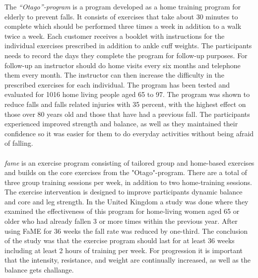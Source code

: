 The \emph{“Otago”-program} is a program developed as a home training program for elderly to prevent falls. It consists of exercises that take about 30 minutes to complete which should be performed three times a week in addition to a walk twice a week. Each customer receives a booklet with instructions for the individual exercises prescribed in addition to ankle cuff weights. The participants needs to record the days they complete the program for follow-up purposes. For follow-up an instructor should do home visits every six months and telephone them every month. The instructor can then increase the difficulty in the prescribed exercises for each individual. The program has been tested and evaluated for 1016 home living people aged 65 to 97. The program was shown to reduce falls and falls related injuries with 35 percent, with the highest effect on those over 80 years old and those that have had a previous fall. The participants experienced improved strength and balance, as well as they maintained their confidence so it was easier for them to do everyday activities without being afraid of falling. \cite{otago} \cite{gruppetrening-trheim}\\ \\
\emph{\ac{fame}} is an exercise program consisting of tailored group and home-based exercises and builds on the core exercises from the "Otago"-program.  There are a total of three group training sessions per week, in addition to two home-training sessions. The exercise intervention is designed to improve participants dynamic balance and core and leg strength.  In the United Kingdom a study was done where they examined the effectiveness of this program for home-living women aged 65 or older who had already fallen 3 or more times within the previous year. After using FaME for 36 weeks the fall rate was reduced by one-third. The conclusion of the study was that the exercise program should last for at least 36 weeks including at least 2 hours of training per week. For progression it is important that the intensity, resistance, and weight are continually increased, as well as the balance gets challange.\cite{fame}\\ \\
